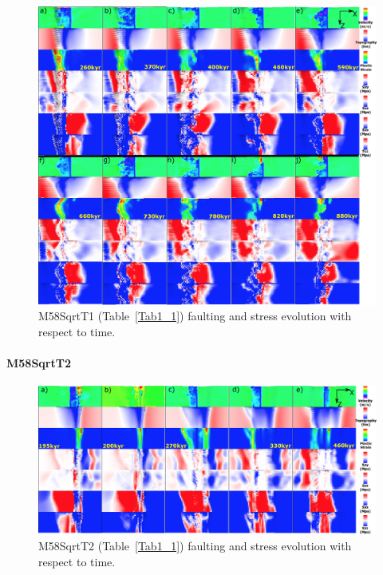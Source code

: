 \begin{figure}[h]
 \centering
  \includegraphics[width=1.0\textwidth]{fig_Results_Weakening_7_M58SqrtT1_time_evolution.eps}
 \caption{M58SqrtT1 (Table~\hyperref[Tab1_1]{\ref{Tab1_1}}) faulting and stress evolution with respect to time.}
\label{fig_Results_Weakenging_7}
\end{figure}

\paragraph{M58SqrtT2} \label{para_M58SqrtT2}

\begin{figure}[h]
 \centering
  \includegraphics[width=1.0\textwidth]{fig_Results_Weakening_8_M58SqrtT2_time_evolution.eps}
 \caption{M58SqrtT2 (Table~\hyperref[Tab1_1]{\ref{Tab1_1}}) faulting and stress evolution with respect to time.}
\label{fig_Results_Weakenging_8}
\end{figure}

